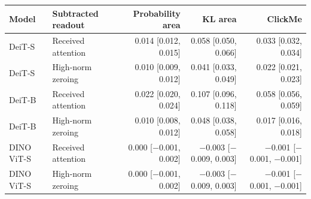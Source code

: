 \begin{tabular}{@{}llrrr@{}}
\toprule
Model & Subtracted readout & Probability area & KL area & ClickMe \\
\midrule
DeiT-S & Received attention & 0.014 [0.012, 0.015] & 0.058 [0.050, 0.066] & 0.033 [0.032, 0.034] \\
DeiT-S & High-norm zeroing & 0.010 [0.009, 0.012] & 0.041 [0.033, 0.049] & 0.022 [0.021, 0.023] \\
DeiT-B & Received attention & 0.022 [0.020, 0.024] & 0.107 [0.096, 0.118] & 0.058 [0.056, 0.059] \\
DeiT-B & High-norm zeroing & 0.010 [0.008, 0.012] & 0.048 [0.038, 0.058] & 0.017 [0.016, 0.018] \\
DINO ViT-S & Received attention & 0.000 [$-$0.001, 0.002] & $-$0.003 [$-$0.009, 0.003] & $-$0.001 [$-$0.001, $-$0.001] \\
DINO ViT-S & High-norm zeroing & 0.000 [$-$0.001, 0.002] & $-$0.003 [$-$0.009, 0.003] & $-$0.001 [$-$0.001, $-$0.001] \\
\bottomrule
\end{tabular}
